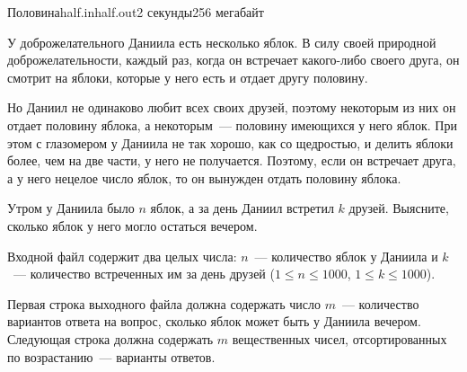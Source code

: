 \begin{problem}{Половина}{half.in}{half.out}{2 секунды}{256 мегабайт}


У доброжелательного Даниила есть несколько яблок. В силу своей природной доброжелательности,
каждый раз, когда он встречает какого-либо своего друга, он смотрит на яблоки, 
которые у него есть и отдает другу половину. 

Но Даниил не одинаково любит всех своих
друзей, поэтому некоторым из них он отдает половину яблока, а некоторым~--- половину 
имеющихся у него яблок. При этом с глазомером у Даниила не так хорошо, как со
щедростью, и делить яблоки более, чем на две части, у него не получается. 
Поэтому, если он встречает друга, а у него нецелое число яблок, то он вынужден 
отдать половину яблока. 

Утром у Даниила было $n$ яблок, а за день Даниил встретил $k$ друзей. 
Выясните, сколько яблок у него могло остаться вечером. 

\InputFile
Входной файл содержит два целых числа: $n$~--- количество яблок у Даниила и $k$~--- количество
встреченных им за день друзей ($1 \le n \le 1000$, $1 \le k \le 1000$).

\OutputFile
Первая строка выходного файла должна содержать число $m$~--- количество вариантов ответа
на вопрос, сколько яблок может быть у Даниила вечером. 
Следующая строка должна содержать $m$ вещественных
чисел, отсортированных по возрастанию~--- варианты ответов.

\Examples

\begin{example}%
%
\end{example}

\end{problem}
